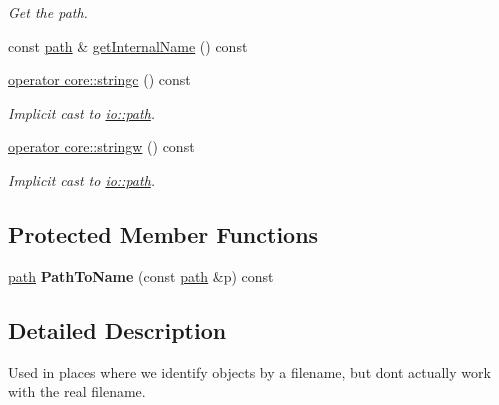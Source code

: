 \begin{DoxyCompactItemize}
\begin{DoxyCompactList}\small\item\em Get the path. \end{DoxyCompactList}\item 
const \hyperlink{namespaceirr_1_1io_ab1bdc45edb3f94d8319c02bc0f840ee1}{path} \& \hyperlink{structirr_1_1io_1_1SNamedPath_ab491ba694139f03d2a8ece5d3efdd7ed}{get\+Internal\+Name} () const 
\item 
\hyperlink{structirr_1_1io_1_1SNamedPath_a4e4f65dd90c3c90ccfeda5588f0db423}{operator core\+::stringc} () const \hypertarget{structirr_1_1io_1_1SNamedPath_a4e4f65dd90c3c90ccfeda5588f0db423}{}\label{structirr_1_1io_1_1SNamedPath_a4e4f65dd90c3c90ccfeda5588f0db423}

\begin{DoxyCompactList}\small\item\em Implicit cast to \hyperlink{namespaceirr_1_1io_ab1bdc45edb3f94d8319c02bc0f840ee1}{io\+::path}. \end{DoxyCompactList}\item 
\hyperlink{structirr_1_1io_1_1SNamedPath_aff4b0d1d31743efc7f54c0fd3244f591}{operator core\+::stringw} () const \hypertarget{structirr_1_1io_1_1SNamedPath_aff4b0d1d31743efc7f54c0fd3244f591}{}\label{structirr_1_1io_1_1SNamedPath_aff4b0d1d31743efc7f54c0fd3244f591}

\begin{DoxyCompactList}\small\item\em Implicit cast to \hyperlink{namespaceirr_1_1io_ab1bdc45edb3f94d8319c02bc0f840ee1}{io\+::path}. \end{DoxyCompactList}\end{DoxyCompactItemize}
\subsection*{Protected Member Functions}
\begin{DoxyCompactItemize}
\item 
\hyperlink{namespaceirr_1_1io_ab1bdc45edb3f94d8319c02bc0f840ee1}{path} {\bfseries Path\+To\+Name} (const \hyperlink{namespaceirr_1_1io_ab1bdc45edb3f94d8319c02bc0f840ee1}{path} \&p) const \hypertarget{structirr_1_1io_1_1SNamedPath_a44b1a0751421673efb55e7d8118199be}{}\label{structirr_1_1io_1_1SNamedPath_a44b1a0751421673efb55e7d8118199be}

\end{DoxyCompactItemize}


\subsection{Detailed Description}
Used in places where we identify objects by a filename, but don\textquotesingle{}t actually work with the real filename. 

